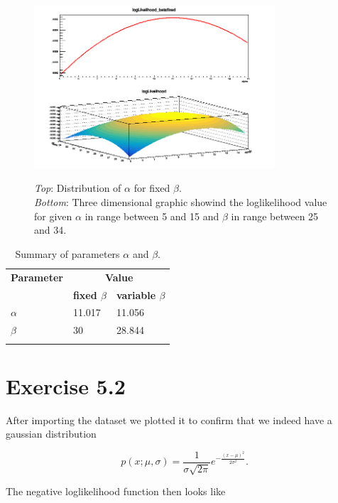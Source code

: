 \documentclass[10pt]{article}
\newenvironment{myfont}{\fontfamily{put}\selectfont}{\par}
\begin{document}
\begin{myfont}
\begin{figure}[H]
  \centering
  \caption{\textit{Top}: Distribution of $\alpha$ for fixed $\beta$. \\
  \textit{Bottom}: Three dimensional graphic showind the loglikelihood value for given $\alpha$ in range between \num{5} and \num{15} and $\beta$ in range between \num{25} and \num{34}.}
  \includegraphics[width = 0.8\textwidth]{./exercise5_1.png}
  \label{fig:ex5_1}
\end{figure}

\begin{longtable}{*{3}l}
\caption{Summary of parameters $\alpha$ and $\beta$.}\endfirsthead
\endhead
\toprule
\textbf{Parameter} & \multicolumn{2}{c}{\textbf{Value}} \\
\cmidrule{2-3}
 & \textbf{fixed $\beta$} & \textbf{variable $\beta$} \\
\midrule
$\alpha$    & \num{11.017}   & \num{11.056} \\ 
$\beta$     & \num{30}       & \num{28.844} \\
\bottomrule
\label{tab:ex5_1}
\end{longtable}


\section*{Exercise 5.2}

After importing the dataset we plotted it to confirm that we indeed have a gaussian distribution

\begin{equation}
p(x;\mu, \sigma) = \frac{1}{\sigma\sqrt{2\pi}} e^{-\frac{\left(x - \mu\right)^{2}}{2\sigma^{2}}}.
\end{equation}

\noindent The negative loglikelihood function then looks like


\end{myfont}
\end{document}
